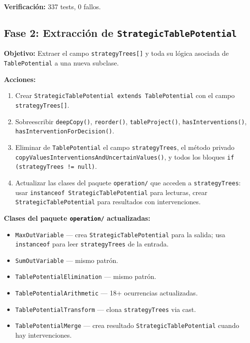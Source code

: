 \documentclass[11pt,a4paper]{article}
\newcommand{\code}[1]{\texttt{#1}}
\begin{document}
\textbf{Verificación:} 337 tests, 0 fallos.

\subsection{Fase 2: Extracción de \code{StrategicTablePotential}}

\textbf{Objetivo:} Extraer el campo \code{strategyTrees[]} y toda su lógica
asociada de \code{TablePotential} a una nueva subclase.

\textbf{Acciones:}
\begin{enumerate}
  \item Crear \code{StrategicTablePotential extends TablePotential} con el campo
        \code{strategyTrees[]}.
  \item Sobreescribir \code{deepCopy()}, \code{reorder()},
        \code{tableProject()}, \code{hasInterventions()},
        \code{has\-Intervention\-For\-Decision()}.
  \item Eliminar de \code{TablePotential} el campo \code{strategyTrees}, el método
        privado
        \code{copy\-Values\-Interventions\-And\-Uncertain\-Values()}, y todos los
        bloques \code{if (strategyTrees != null)}.
  \item Actualizar las clases del paquete \code{operation/} que acceden a
        \code{strategyTrees}: usar \code{instanceof StrategicTablePotential} para
        lecturas, crear \code{StrategicTablePotential} para resultados con
        intervenciones.
\end{enumerate}

\textbf{Clases del paquete \code{operation/} actualizadas:}
\begin{itemize}
  \item \code{MaxOutVariable} --- crea \code{StrategicTablePotential} para la salida;
        usa \code{instanceof} para leer \code{strategyTrees} de la entrada.
  \item \code{SumOutVariable} --- mismo patrón.
  \item \code{TablePotentialElimination} --- mismo patrón.
  \item \code{TablePotentialArithmetic} --- 18+ ocurrencias actualizadas.
  \item \code{TablePotentialTransform} --- clona \code{strategyTrees} via cast.
  \item \code{TablePotentialMerge} --- crea resultado
        \code{StrategicTablePotential} cuando hay intervenciones.
\end{itemize}
\end{document}
